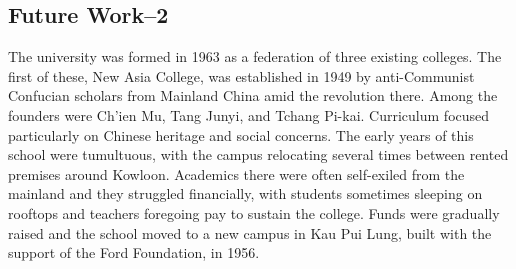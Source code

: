 \subsection{Future Work--2}
The university was formed in 1963 as a federation of three existing colleges. The first of these, New Asia College, was established in 1949 by anti-Communist Confucian scholars from Mainland China amid the revolution there. Among the founders were Ch'ien Mu, Tang Junyi, and Tchang Pi-kai. Curriculum focused particularly on Chinese heritage and social concerns. The early years of this school were tumultuous, with the campus relocating several times between rented premises around Kowloon. Academics there were often self-exiled from the mainland and they struggled financially, with students sometimes sleeping on rooftops and teachers foregoing pay to sustain the college. Funds were gradually raised and the school moved to a new campus in Kau Pui Lung, built with the support of the Ford Foundation, in 1956.